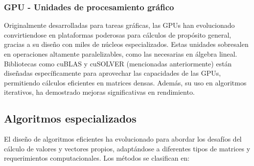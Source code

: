 \documentclass{article}
\begin{document}
\subsubsection{GPU - Unidades de procesamiento gráfico}
Originalmente desarrolladas para tareas gráficas, las GPUs han evolucionado convirtiendose en plataformas poderosas para cálculos de propósito general, gracias a su diseño con miles de núcleos especializados. Estas unidades sobresalen en operaciones altamente paralelizables, como las necesarias en álgebra lineal. Bibliotecas como cuBLAS y cuSOLVER (mencionadas anteriormente) están diseñadas específicamente para aprovechar las capacidades de las GPUs, permitiendo cálculos eficientes en matrices densas. Además, su uso en algoritmos iterativos, ha demostrado mejoras significativas en rendimiento.



\subsection{Algoritmos especializados}
El diseño de algoritmos eficientes ha evolucionado para abordar los desafíos del cálculo de valores y vectores propios, adaptándose a diferentes tipos de matrices y requerimientos computacionales. Los métodos se clasifican en:
\end{document}
